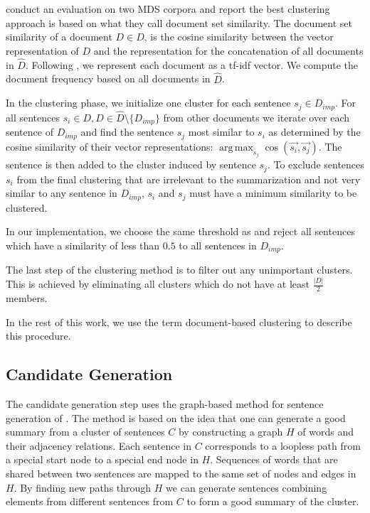\documentclass[a4paper,BCOR=10mm]{report}
\DeclareMathOperator*{\argmax}{arg\,max}
\numberwithin{lemma}{chapter}
\numberwithin{definition}{chapter}
\begin{document}
\citeauthor{banerjee} conduct an evaluation on two MDS corpora and report the best clustering approach is based on what they call document set similarity.
The document set similarity of a document $D \in \widehat{D}$, is the cosine similarity between the vector representation of $D$ and the representation for the concatenation of all documents in $\widehat{D}$.
Following \citeauthor{banerjee}, we represent each document as a tf-idf vector. We compute the document frequency based on all documents in $\widehat{D}$.

In the clustering phase, we initialize one cluster for each sentence $s_j \in D_{imp}$. For all sentences $s_i \in D, D \in \widehat{D} \setminus \{D_{imp}\}$ from other documents we iterate over each sentence of $D_{imp}$ and find the sentence $s_j$ most similar to $s_i$ as determined by the cosine similarity of their vector representations: $\argmax_{s_j} \cos(\vec{s_i}, \vec{s_j})$. The sentence is then added to the cluster induced by sentence $s_j$. To exclude sentences $s_i$ from the final clustering that are irrelevant to the summarization and not very similar to any sentence in $D_{imp}$, $s_i$ and $s_j$ must have a minimum similarity to be clustered.

In our implementation, we choose the same threshold as \citeauthor{banerjee} and reject all sentences which have a similarity of less than $0.5$ to all sentences in $D_{imp}$.

The last step of the clustering method is to filter out any unimportant clusters. This is achieved by eliminating all clusters which do not have at least $\frac{|D|}{2}$ members.

In the rest of this work, we use the term document-based clustering to describe this procedure.


\subsection{Candidate Generation} \label{sec:baseline-generation}

The candidate generation step uses the graph-based method for sentence generation of \citet{filippova}. The method is based on the idea that one can generate a good summary from a cluster of sentences $C$ by constructing a graph $H$ of words and their adjacency relations. Each sentence in $C$ corresponds to a loopless path from a special start node to a special end node in $H$. Sequences of words that are shared between two sentences are mapped to the same set of nodes and edges in $H$. By finding new paths through $H$ we can generate sentences combining elements from different sentences from $C$ to form a good summary of the cluster.
\end{document}
